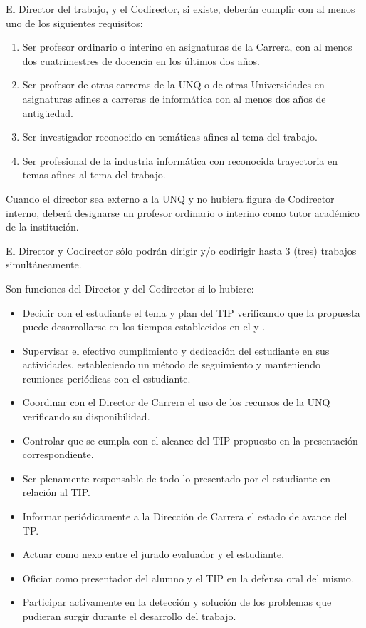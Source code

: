\articulo El Director del trabajo, y el Codirector, si existe,
deberán cumplir con al menos uno de los siguientes requisitos:
\begin{enumerate}
\item Ser profesor ordinario o interino en asignaturas de la Carrera, con al
menos dos cuatrimestres de docencia en los últimos dos años.
\item Ser profesor de otras carreras de la UNQ o de otras Universidades en
asignaturas afines a carreras de informática con al menos dos años de
antigüedad.
\item Ser investigador reconocido en temáticas afines al tema del trabajo.
\item Ser profesional de la industria informática con reconocida trayectoria en
temas afines al tema del trabajo.
\end{enumerate}

\articulo Cuando el director sea externo a la UNQ y no hubiera figura de
Codirector interno, deberá designarse un profesor ordinario o interino como tutor
académico de la institución.

\articulo El Director y Codirector sólo podrán dirigir y/o codirigir hasta 3
(tres) trabajos simultáneamente. 

\articulo Son funciones del Director y del Codirector si lo hubiere:
\begin{itemize}
 \item Decidir con el estudiante el tema y plan del TIP verificando que la
 propuesta puede desarrollarse en los tiempos establecidos en el
 \artHoras y \artTiempo.
 \item Supervisar el efectivo cumplimiento y dedicación del estudiante en
 sus actividades, estableciendo un método de seguimiento y
 manteniendo reuniones periódicas con el estudiante.
 \item Coordinar con el Director de Carrera el uso de los recursos de la
 UNQ verificando su disponibilidad.
 \item Controlar que se cumpla con el alcance del TIP propuesto en la
 presentación correspondiente.
 \item Ser plenamente responsable de todo lo presentado por el
 estudiante en relación al TIP.
 \item Informar periódicamente a la Dirección de Carrera el estado de
 avance del TP.
 \item Actuar como nexo entre el jurado evaluador y el estudiante.
 \item Oficiar como presentador del alumno y el TIP en la defensa oral del
 mismo.
 \item Participar activamente en la detección y solución de los problemas
 que pudieran surgir durante el desarrollo del trabajo.
\end{itemize}


